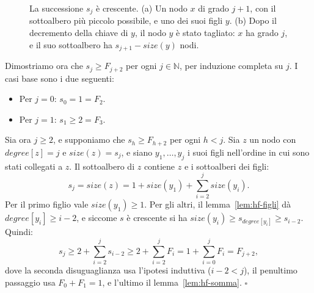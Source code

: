 \begin{figure}[htbp]
\centering
{}
\caption{La successione $s_j$ è crescente. (a) Un nodo $x$ di grado $j+1$, con il sottoalbero più piccolo possibile, e uno dei suoi figli $y$. (b) Dopo il decremento della chiave di $y$, il nodo $y$ è stato tagliato: $x$ ha grado $j$, e il suo sottoalbero ha $s_{j+1} - \mathit{size}(y)$ nodi.}
\label{fig:hf-sj}
\end{figure}

Dimostriamo ora che $s_j \ge F_{j+2}$ per ogni $j \in \mathbb{N}$, per induzione completa su $j$. I casi base sono i due seguenti:
\begin{itemize}
    \item Per $j = 0$: $s_0 = 1 = F_2$.
    \item Per $j = 1$: $s_1 \ge 2 = F_3$.
\end{itemize}

Sia ora $j \ge 2$, e supponiamo che $s_h \ge F_{h+2}$ per ogni $h < j$. Sia $z$ un nodo con $\mathit{degree}[z] = j$ e $\mathit{size}(z) = s_j$, e siano $y_1, \ldots, y_j$ i suoi figli nell'ordine in cui sono stati collegati a $z$. Il sottoalbero di $z$ contiene $z$ e i sottoalberi dei figli:
\[
s_j = \mathit{size}(z) = 1 + \mathit{size}(y_1) + \sum_{i=2}^{j} \mathit{size}(y_i).
\]
Per il primo figlio vale $\mathit{size}(y_1) \ge 1$. Per gli altri, il lemma~\ref{lem:hf-figli} dà $\mathit{degree}[y_i] \ge i - 2$, e siccome $s$ è crescente si ha $\mathit{size}(y_i) \ge s_{\mathit{degree}[y_i]} \ge s_{i-2}$. Quindi:
\[
s_j \ge 2 + \sum_{i=2}^{j} s_{i-2} \ge 2 + \sum_{i=2}^{j} F_i = 1 + \sum_{i=0}^{j} F_i = F_{j+2},
\]
dove la seconda disuguaglianza usa l'ipotesi induttiva ($i - 2 < j$), il penultimo passaggio usa $F_0 + F_1 = 1$, e l'ultimo il lemma~\ref{lem:hf-somma}. \hfill $\square$

